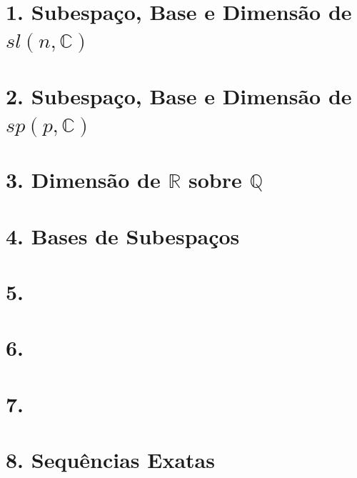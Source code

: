 \documentclass[12pt,a4paper]{article}
\begin{document}
\section*{1. Subespaço, Base e Dimensão de $sl(n,\mathbb{C})$}


\section*{2. Subespaço, Base e Dimensão de $sp(p,\mathbb{C})$}


\section*{3. Dimensão de $\mathbb{R}$ sobre $\mathbb{Q}$}


\section*{4. Bases de Subespaços}


\section*{5. }


\section*{6. }


\section*{7. }


\section*{8. Sequências Exatas}



































\end{document}
